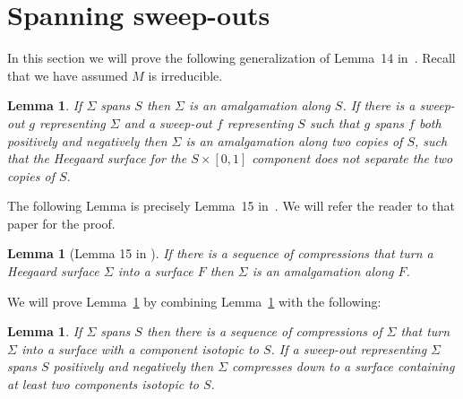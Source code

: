 \documentclass[12pt]{amsart}
\theoremstyle{plain}
\newtheorem{Lem}[Thm]{Lemma}
\theoremstyle{definition}
\begin{document}
\section{Spanning sweep-outs}

In this section we will prove the following generalization of Lemma~14 in~\cite{me:stabs}.  Recall that we have assumed $M$ is irreducible.

\begin{Lem}
\label{bothspanlem}
If $\Sigma$ spans $S$ then $\Sigma$ is an amalgamation along $S$.  If there is a sweep-out $g$ representing $\Sigma$ and a sweep-out $f$ representing $S$ such that $g$ spans $f$ both positively and negatively then $\Sigma$ is an amalgamation along two copies of $S$, such that the Heegaard surface for the $S \times [0,1]$ component does not separate the two copies of $S$.
\end{Lem}

The following Lemma is precisely Lemma~15 in~\cite{me:stabs}. We will refer the reader to that paper for the proof.

\begin{Lem}[Lemma 15 in \cite{me:stabs}]
\label{compressthenamalglem}
If there is a sequence of compressions that turn a Heegaard surface $\Sigma$ into a surface $F$ then $\Sigma$ is an amalgamation along $F$.
\end{Lem}

We will prove Lemma~\ref{bothspanlem} by combining Lemma~\ref{compressthenamalglem} with the following:

\begin{Lem}
\label{spanthencompresslem}
If $\Sigma$ spans $S$ then there is a sequence of compressions of $\Sigma$ that turn $\Sigma$ into a surface with a component isotopic to $S$.  If a sweep-out representing $\Sigma$ spans $S$ positively and negatively then $\Sigma$ compresses down to a surface containing at least two components isotopic to $S$.
\end{Lem}
\end{document}
